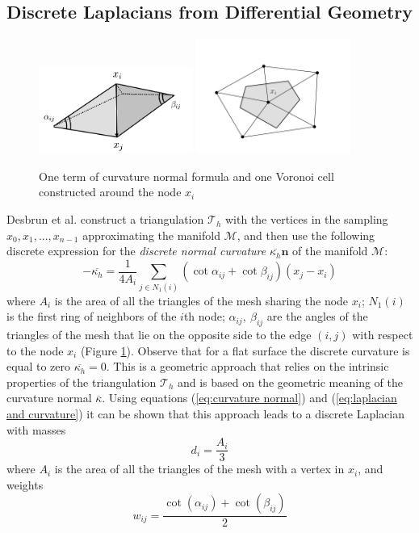 \subsection{Discrete Laplacians from Differential Geometry}
\begin{figure}[h]
	\begin{center}
		\includegraphics[width=0.45\textwidth]{figs/Chapter3/MyDesbrun.png}
		\includegraphics[width=0.45\textwidth]{figs/Chapter3/Voronoi}
	\end{center}
	\caption{\label{fig:Desbrun}One term of curvature normal formula and one Voronoi cell constructed around the node $x_i$}
\end{figure} 
Desbrun et al. \cite{Desbrun1999} construct a triangulation $\mathcal T_h$ with the vertices in the sampling $x_0, x_1, ..., x_{n-1}$ approximating the manifold $\mathcal M$, and then use the following discrete expression for the \textit{discrete normal curvature} $\overline{\kappa_h} \mathbf{n}$ of the manifold $\mathcal M$:
\begin{equation}\label{eq:curvature normal}
	-\overline{\kappa_h} =\frac{1}{4 A_i} \sum_{j \in N_{1}(i)}\left(\cot \alpha_{ij}+\cot \beta_{ij}\right)\left(x_{j}-x_{i}\right)
\end{equation}
where $A_i$ is the area of all the triangles of the mesh sharing the node $x_i$; $N_1(i)$ is the first ring of neighbors of the $i$th node; $\alpha_{i j},\ \beta_{i j}$ are the angles of the triangles of the mesh that lie on the opposite side to the edge $(i,j)$ with respect to the node $x_i$ (Figure \ref{fig:Desbrun}). Observe that for a flat surface the discrete curvature is equal to zero $\overline{\kappa_h}=0$. This is a geometric approach that relies on the intrinsic properties of the triangulation $\mathcal T_h$ and is based on the geometric meaning of the curvature normal $\overline{\kappa}$. Using equations (\ref{eq:curvature normal}) and (\ref{eq:laplacian and curvature}) it can be shown \cite{REUTER2009381} that this approach leads to a discrete Laplacian with masses
$$
d_i=\frac{A_i}{3}
$$
where $A_i$ is the area of all the triangles of the mesh with a vertex in $x_i$, and weights
$$
w_{i j}=\frac{\cot \left(\alpha_{i j}\right)+\cot \left(\beta_{i j}\right)}{2}
$$

